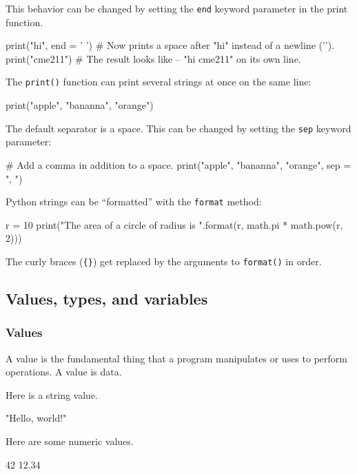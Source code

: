 \documentclass[12pt,letterpaper,twoside]{article}
\begin{document}
This behavior can be changed by setting the \texttt{end} keyword
parameter in the print function.

\begin{python}
print("hi", end = ' ')  # Now prints a space after "hi" instead of a newline ('\n').
print("cme211")         # The result looks like -- "hi cme211" on its own line.
\end{python}

The \texttt{print()} function can print several strings at once on the
same line:

\begin{python}
print("apple", "bananna", "orange")
\end{python}

The default separator is a space. This can be changed by setting the
\texttt{sep} keyword parameter:

\begin{python}
# Add a comma in addition to a space.
print("apple", "bananna", "orange", sep = ", ")  
\end{python}

Python strings can be ``formatted'' with the \texttt{format} method:


\begin{python}
r = 10
print("The area of a circle of radius {} is {}".format(r, math.pi * math.pow(r, 2)))
\end{python}

The curly braces (\texttt{\{\}}) get replaced by the arguments to
\texttt{format()} in order.

\subsection{Values, types, and variables}

\subsubsection{Values}
A value is the fundamental thing that a program manipulates or uses to
perform operations. A value is data.

Here is a string value.

\begin{python}
"Hello, world!"
\end{python}

Here are some numeric values.

\begin{python}
42
12.34
\end{python}
\end{document}
